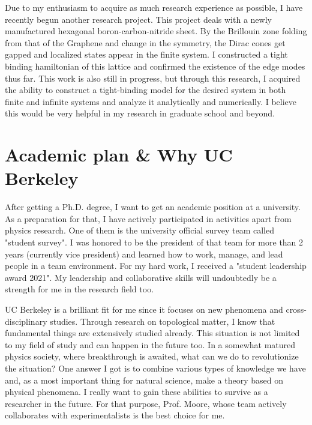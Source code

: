\documentclass[a4]{article}
\begin{document}
Due to my enthusiasm to acquire as much research experience as possible, I have recently begun another research project. This project deals with a newly manufactured hexagonal boron-carbon-nitride sheet. By the Brillouin zone folding from that of the Graphene and change in the symmetry, the Dirac cones get gapped and localized states appear in the finite system. I constructed a tight binding hamiltonian of this lattice and confirmed the existence of the edge modes thus far. This work is also still in progress, but through this research, I acquired the ability to construct a tight-binding model for the desired system in both finite and infinite systems and analyze it analytically and numerically. I believe this would be very helpful in my research in graduate school and beyond.


\section{Academic plan \& Why UC Berkeley}
After getting a Ph.D. degree, I want to get an academic position at a university. As a preparation for that, I have actively participated in activities apart from physics research. One of them is the university official survey team called "student survey". I was honored to be the president of that team for more than 2 years (currently vice president) and learned how to work, manage, and lead people in a team environment. For my hard work, I received a "student leadership award 2021". My leadership and collaborative skills will undoubtedly be a strength for me in the research field too.

UC Berkeley is a brilliant fit for me since it focuses on new phenomena and cross-disciplinary studies. Through research on topological matter, I know that fundamental things are extensively studied already. This situation is not limited to my field of study and can happen in the future too. In a somewhat matured physics society, where breakthrough is awaited, what can we do to revolutionize the situation? One answer I got is to combine various types of knowledge we have and, as a most important thing for natural science, make a theory based on physical phenomena. I really want to gain these abilities to survive as a researcher in the future. For that purpose, Prof. Moore, whose team actively collaborates with experimentalists is the best choice for me.
\end{document}
